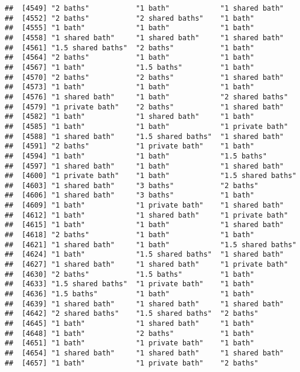 \documentclass[
]{article}
\begin{document}
\begin{verbatim}
##  [4549] "2 baths"           "1 bath"            "1 shared bath"    
##  [4552] "2 baths"           "2 shared baths"    "1 bath"           
##  [4555] "1 bath"            "1 bath"            "1 bath"           
##  [4558] "1 shared bath"     "1 shared bath"     "1 shared bath"    
##  [4561] "1.5 shared baths"  "2 baths"           "1 bath"           
##  [4564] "2 baths"           "1 bath"            "1 bath"           
##  [4567] "1 bath"            "1.5 baths"         "1 bath"           
##  [4570] "2 baths"           "2 baths"           "1 shared bath"    
##  [4573] "1 bath"            "1 bath"            "1 bath"           
##  [4576] "1 shared bath"     "1 bath"            "2 shared baths"   
##  [4579] "1 private bath"    "2 baths"           "1 shared bath"    
##  [4582] "1 bath"            "1 shared bath"     "1 bath"           
##  [4585] "1 bath"            "1 bath"            "1 private bath"   
##  [4588] "1 shared bath"     "1.5 shared baths"  "1 shared bath"    
##  [4591] "2 baths"           "1 private bath"    "1 bath"           
##  [4594] "1 bath"            "1 bath"            "1.5 baths"        
##  [4597] "1 shared bath"     "1 bath"            "1 shared bath"    
##  [4600] "1 private bath"    "1 bath"            "1.5 shared baths" 
##  [4603] "1 shared bath"     "3 baths"           "2 baths"          
##  [4606] "1 shared bath"     "3 baths"           "1 bath"           
##  [4609] "1 bath"            "1 private bath"    "1 shared bath"    
##  [4612] "1 bath"            "1 shared bath"     "1 private bath"   
##  [4615] "1 bath"            "1 bath"            "1 shared bath"    
##  [4618] "2 baths"           "1 bath"            "1 bath"           
##  [4621] "1 shared bath"     "1 bath"            "1.5 shared baths" 
##  [4624] "1 bath"            "1.5 shared baths"  "1 shared bath"    
##  [4627] "1 shared bath"     "1 shared bath"     "1 private bath"   
##  [4630] "2 baths"           "1.5 baths"         "1 bath"           
##  [4633] "1.5 shared baths"  "1 private bath"    "1 bath"           
##  [4636] "1.5 baths"         "1 bath"            "1 bath"           
##  [4639] "1 shared bath"     "1 shared bath"     "1 shared bath"    
##  [4642] "2 shared baths"    "1.5 shared baths"  "2 baths"          
##  [4645] "1 bath"            "1 shared bath"     "1 bath"           
##  [4648] "1 bath"            "2 baths"           "1 bath"           
##  [4651] "1 bath"            "1 private bath"    "1 bath"           
##  [4654] "1 shared bath"     "1 shared bath"     "1 shared bath"    
##  [4657] "1 bath"            "1 private bath"    "2 baths"          

\end{verbatim}
\end{document}
